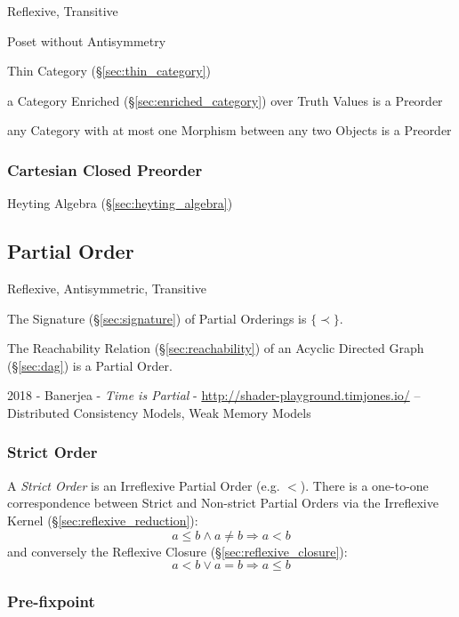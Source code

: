 Reflexive, Transitive

Poset without Antisymmetry

Thin Category (\S\ref{sec:thin_category})

a Category Enriched (\S\ref{sec:enriched_category}) over Truth Values
is a Preorder

any Category with at most one Morphism between any two Objects is a Preorder



\subsubsection{Cartesian Closed Preorder}\label{sec:cartesian_preorder}

Heyting Algebra (\S\ref{sec:heyting_algebra})



\subsection{Partial Order}\label{sec:partial_order}

Reflexive, Antisymmetric, Transitive

The Signature (\S\ref{sec:signature}) of Partial Orderings is
$\{\prec\}$.

The Reachability Relation (\S\ref{sec:reachability}) of an Acyclic
Directed Graph (\S\ref{sec:dag}) is a Partial Order.

2018 - Banerjea - \emph{Time is Partial} -
\url{http://shader-playground.timjones.io/} -- Distributed Consistency Models,
Weak Memory Models



\subsubsection{Strict Order}\label{sec:strict_order}

A \emph{Strict Order} is an Irreflexive Partial Order (e.g. $<$).
There is a one-to-one correspondence between Strict and Non-strict
Partial Orders via the Irreflexive Kernel
(\S\ref{sec:reflexive_reduction}):
\[
  a \leq b \wedge a \neq b \Rightarrow a < b
\]
and conversely the Reflexive Closure (\S\ref{sec:reflexive_closure}):
\[
  a < b \vee a = b \Rightarrow a \leq b
\]



\subsubsection{Pre-fixpoint}\label{sec:prefixpoint}

